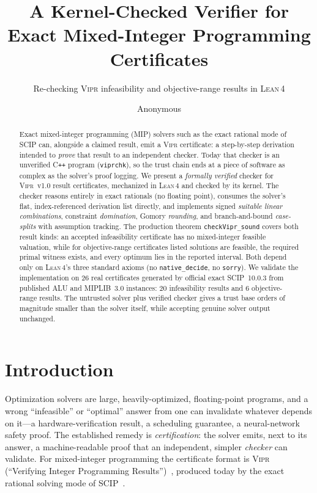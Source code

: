 \documentclass[runningheads]{llncs}
\newcommand{\code}[1]{\texttt{#1}}
\newcommand{\scip}{\textsc{SCIP}}
\newcommand{\vipr}{\textsc{Vipr}}
\newcommand{\lean}{\textsc{Lean\,4}}
\begin{document}
\title{A Kernel-Checked Verifier for Exact Mixed-Integer Programming Certificates}
\subtitle{Re-checking \vipr{} infeasibility and objective-range results in \lean{}}

\author{Anonymous}

\maketitle

\begin{abstract}
Exact mixed-integer programming (MIP) solvers such as the exact rational mode of
\scip{} can, alongside a claimed result, emit a \vipr{} certificate: a step-by-step
derivation intended to \emph{prove} that result to an independent checker. Today that
checker is an unverified C\texttt{++} program (\code{viprchk}), so the trust chain ends
at a piece of software as complex as the solver's proof logging. We present a
\emph{formally verified} checker for \vipr~v1.0 result certificates, mechanized in
\lean{} and checked by its kernel. The checker reasons entirely in exact rationals (no
floating point), consumes the solver's flat, index-referenced derivation list directly,
and implements signed \emph{suitable linear combinations}, constraint
\emph{domination}, Gomory \emph{rounding}, and branch-and-bound \emph{case-splits}
with assumption tracking. The production theorem \code{checkVipr\_sound}
covers both result kinds: an accepted infeasibility certificate has no
mixed-integer feasible valuation, while for objective-range certificates
listed solutions are feasible, the required primal witness exists, and every optimum
lies in the reported interval. Both depend only on \lean{}'s three standard axioms
(no \code{native\_decide}, no \code{sorry}). We validate the implementation on 26 real
certificates generated by official exact \scip~10.0.3 from published ALU and MIPLIB~3.0
instances: 20 infeasibility results and 6 objective-range results. The untrusted solver
plus verified checker gives a trust base orders of magnitude smaller than the solver
itself, while accepting genuine solver output unchanged.
\end{abstract}

\section{Introduction}\label{sec:intro}

Optimization solvers are large, heavily-optimized, floating-point programs, and a wrong
``infeasible'' or ``optimal'' answer from one can invalidate whatever depends on it---a
hardware-verification result, a scheduling guarantee, a neural-network safety proof. The
established remedy is \emph{certification}: the solver emits, next to its answer, a
machine-readable proof that an independent, simpler \emph{checker} can validate. For
mixed-integer programming the certificate format is \vipr{} (``Verifying Integer
Programming Results'')~\cite{vipr}, produced today by the exact rational solving mode of
\scip{}~\cite{eifler,scip}.
\end{document}
